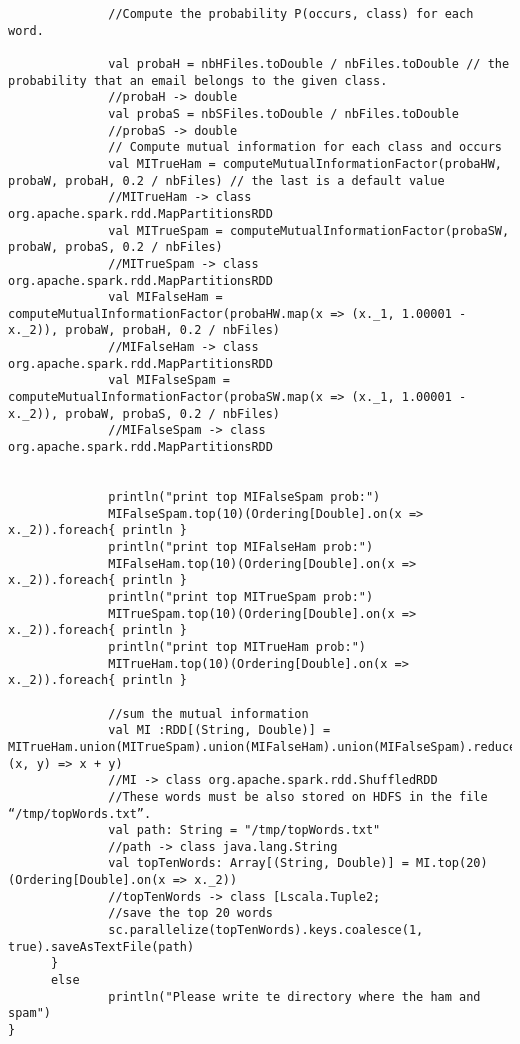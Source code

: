 \documentclass[paper=a4, fontsize=11pt]{scrartcl}
\numberwithin{equation}{section}		%
\numberwithin{figure}{section}			%
\numberwithin{table}{section}				%
\begin{document}
\begin{lstlisting}
              //Compute the probability P(occurs, class) for each word.

              val probaH = nbHFiles.toDouble / nbFiles.toDouble // the probability that an email belongs to the given class.
              //probaH -> double
              val probaS = nbSFiles.toDouble / nbFiles.toDouble
              //probaS -> double
              // Compute mutual information for each class and occurs
              val MITrueHam = computeMutualInformationFactor(probaHW, probaW, probaH, 0.2 / nbFiles) // the last is a default value
              //MITrueHam -> class org.apache.spark.rdd.MapPartitionsRDD
              val MITrueSpam = computeMutualInformationFactor(probaSW, probaW, probaS, 0.2 / nbFiles)
              //MITrueSpam -> class org.apache.spark.rdd.MapPartitionsRDD
              val MIFalseHam = computeMutualInformationFactor(probaHW.map(x => (x._1, 1.00001 - x._2)), probaW, probaH, 0.2 / nbFiles)
              //MIFalseHam -> class org.apache.spark.rdd.MapPartitionsRDD
              val MIFalseSpam = computeMutualInformationFactor(probaSW.map(x => (x._1, 1.00001 - x._2)), probaW, probaS, 0.2 / nbFiles)
              //MIFalseSpam -> class org.apache.spark.rdd.MapPartitionsRDD


              println("print top MIFalseSpam prob:")
              MIFalseSpam.top(10)(Ordering[Double].on(x => x._2)).foreach{ println }
              println("print top MIFalseHam prob:")
              MIFalseHam.top(10)(Ordering[Double].on(x => x._2)).foreach{ println }
              println("print top MITrueSpam prob:")
              MITrueSpam.top(10)(Ordering[Double].on(x => x._2)).foreach{ println }
              println("print top MITrueHam prob:")
              MITrueHam.top(10)(Ordering[Double].on(x => x._2)).foreach{ println }

              //sum the mutual information
              val MI :RDD[(String, Double)] = MITrueHam.union(MITrueSpam).union(MIFalseHam).union(MIFalseSpam).reduceByKey( (x, y) => x + y)
              //MI -> class org.apache.spark.rdd.ShuffledRDD
              //These words must be also stored on HDFS in the file “/tmp/topWords.txt”.
              val path: String = "/tmp/topWords.txt"
              //path -> class java.lang.String
              val topTenWords: Array[(String, Double)] = MI.top(20)(Ordering[Double].on(x => x._2))
              //topTenWords -> class [Lscala.Tuple2;
              //save the top 20 words
              sc.parallelize(topTenWords).keys.coalesce(1, true).saveAsTextFile(path)
      }
      else
              println("Please write te directory where the ham and spam")
}

\end{lstlisting}
\end{document}
